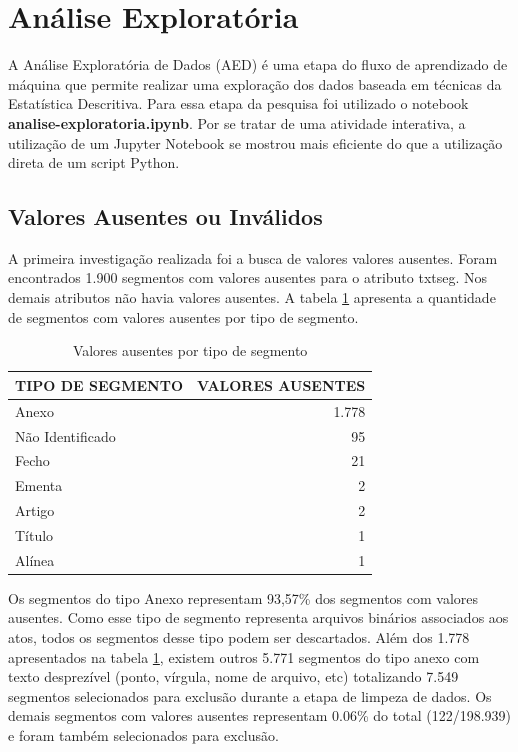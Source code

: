 \section{Análise Exploratória}

A Análise Exploratória de Dados (AED) é uma etapa do fluxo de aprendizado de máquina que permite realizar uma exploração dos dados baseada em técnicas da Estatística Descritiva. Para essa etapa da pesquisa foi utilizado o notebook \textbf{analise-exploratoria.ipynb}. Por se tratar de uma atividade interativa, a utilização de um Jupyter Notebook se mostrou mais eficiente do que a utilização direta de um script Python.

\subsection{Valores Ausentes ou Inválidos}

A primeira investigação realizada foi a busca de valores valores ausentes. Foram encontrados 1.900 segmentos com valores ausentes para o atributo txt\textunderscore seg. Nos demais atributos não havia valores ausentes. A tabela \ref{tab:valores-ausentes} apresenta a quantidade de segmentos com valores ausentes por tipo de segmento.

\begin{table}[h] 
\caption{Valores ausentes por tipo de segmento}
\label{tab:valores-ausentes}
	\begin{center} 
		\begin{tabular}{|l|r|} 
			\hline TIPO DE SEGMENTO & VALORES AUSENTES \\
			\hline
			\hline Anexo & 1.778 \\
			\hline Não Identificado & 95 \\			
			\hline Fecho & 21 \\
			\hline Ementa & 2 \\			
			\hline Artigo & 2 \\
			\hline Título & 1 \\
			\hline Alínea & 1 \\			
			\hline
		\end{tabular}
	\end{center}
	\fdp
\end{table} 

Os segmentos do tipo Anexo representam 93,57\% dos segmentos com valores ausentes. Como esse tipo de segmento representa arquivos binários associados aos atos, todos os segmentos desse tipo podem ser descartados. Além dos 1.778 apresentados na tabela \ref{tab:valores-ausentes}, existem outros 5.771 segmentos do tipo anexo com texto desprezível (ponto, vírgula, nome de arquivo, etc) totalizando 7.549 segmentos selecionados para exclusão durante a etapa de limpeza de dados. Os demais segmentos com valores ausentes representam 0.06\% do total (122/198.939) e foram também selecionados para exclusão.

